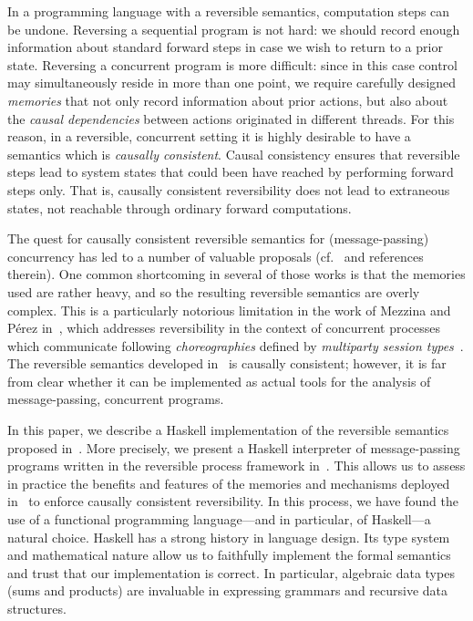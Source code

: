\documentclass[runningheads]{llncs}
\begin{document}
In a programming language with a reversible semantics, computation steps can be undone.
Reversing a sequential program is not hard: we should record enough information about standard forward steps in case we wish to return to a prior state. Reversing a concurrent program is  more difficult: since in this case control may simultaneously reside in more than one point, we require carefully designed \emph{memories} that not only record information about prior actions, but also about the \emph{causal dependencies} between actions originated in different threads.
For this reason, in a reversible, concurrent setting it is highly desirable to have a semantics which is \emph{causally consistent}. Causal consistency ensures that reversible steps lead to system states that could been have reached by performing forward steps only. That is, causally consistent reversibility does not lead to extraneous states, not reachable through ordinary forward computations.

The quest for causally consistent reversible semantics for (message-passing) concurrency has led to a number of valuable proposals (cf.~\cite{DBLP:conf/ppdp/MezzinaP17} and references therein). One common shortcoming in several of those works is that the memories used are rather heavy, and so the resulting reversible semantics are overly complex. This is a particularly notorious limitation in the work of Mezzina and P\'{e}rez in~\cite{DBLP:conf/ppdp/MezzinaP17}, which addresses reversibility in the context of concurrent processes which communicate following \emph{choreographies} defined by \emph{multiparty session types}~\cite{HYC08}. The reversible semantics developed in~\cite{DBLP:conf/ppdp/MezzinaP17} is causally consistent; however, it is far from clear whether it can be implemented as  actual tools for the  analysis of message-passing, concurrent programs.

In this paper, we describe a Haskell implementation of the reversible semantics proposed in~\cite{DBLP:conf/ppdp/MezzinaP17}. More precisely, we present a Haskell interpreter of message-passing programs written in the reversible process framework in~\cite{DBLP:conf/ppdp/MezzinaP17}. This allows us to assess in practice the benefits and features of the memories and mechanisms deployed in~\cite{DBLP:conf/ppdp/MezzinaP17} to enforce causally consistent reversibility. In this process, we have found the use of a functional programming language---and in particular, of Haskell---a natural choice. Haskell has a strong history in language design. Its type system and mathematical nature allow us to faithfully implement the formal semantics and trust that our implementation is correct. In particular, algebraic data types (sums and products) are invaluable in expressing grammars and recursive data structures. 
\end{document}
